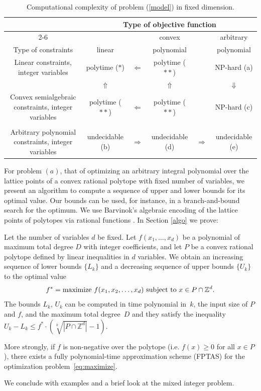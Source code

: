 \documentclass[twoside]{article}
\newcommand{\Z}{\mathbb Z}
\newcommand{\1}{{\bf 1}}
\begin{document}
\begin{table}[htbp]
\small
\caption{Computational complexity of problem (\ref{model}) in fixed dimension.}
\label{gogo}
\begin{center}
\begin{tabular}{cc@{ }c@{ }c@{ }c@{ }c} \toprule
& \multicolumn{5}{c}{Type of objective function}\\
\cmidrule{2-6}
               &        & & convex      & & arbitrary  \\ 
Type of constraints & linear           & & polynomial  & & polynomial  \\ \midrule
Linear constraints, integer variables               & polytime ($*$) & $\Leftarrow$ &  polytime ($**$) &  & NP-hard (a)   \\ 
& $\Uparrow$ & & $\Uparrow$ & & $\Downarrow$ \\
Convex semialgebraic constraints, integer variables & polytime ($**$) & $\Leftarrow$ & polytime ($**$) &  & NP-hard (c)   \\
\\
Arbitrary polynomial constraints, integer variables & undecidable (b) & $\Rightarrow$ & undecidable (d) & $\Rightarrow$ & undecidable (e) \\
\bottomrule
\end{tabular}
\end{center}
\end{table}

 For problem $(a)$, that of optimizing an arbitrary 
integral polynomial over the lattice points of a convex rational
polytope with fixed number of variables, we present an algorithm to
compute a sequence of upper and lower bounds for its optimal value.
Our bounds can be used, for instance, in a branch-and-bound search for
the optimum.  We use Barvinok's algebraic encoding of the lattice points of
polytopes via rational functions \cite{BarviPom}. In Section \ref{algo}
we prove:

\begin{theorem} \label{main} Let the number of variables $d$ be fixed.  
  Let $f(x_1,\dots,x_d)$ be a polynomial of maximum total degree $D$ with
  integer coefficients, and let $P$ be a convex rational polytope
  defined by linear inequalities in $d$ variables.  We obtain an
  increasing sequence of lower bounds $\{L_k\}$ and a decreasing
  sequence of upper bounds $\{U_k\}$ to the optimal value
  \begin{equation}
    f^*=\hbox{maximize} \  f(x_1,x_2,\dots,x_d) \ \hbox{subject to} \ x
    \in P \cap \Z^d.\label{eq:maximize}
  \end{equation}
  The bounds $L_k$, $U_k$ can be computed in time polynomial in~$k$,
  the input size of $P$ and $f$, and the maximum total degree~$D$ and
  they satisfy the inequality $U_k-L_k \leq f^* \cdot (\sqrt[k]{|P
    \cap \Z^d|}-1).$
  
  More strongly, if $f$ is non-negative over the polytope (i.e.
  $f(x)\geq 0$ for all $x \in P$), there exists a fully
  polynomial-time approximation scheme (FPTAS) for the optimization
  problem~\eqref{eq:maximize}.

\end{theorem} 
\noindent We conclude with examples and a brief look at the mixed integer problem.
\end{document}
